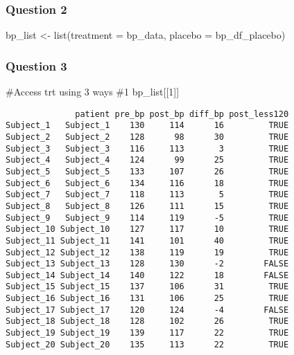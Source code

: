 \documentclass[
  letterpaper,
  DIV=11,
  numbers=noendperiod]{scrartcl}
\newenvironment{Shaded}{\begin{snugshade}}{\end{snugshade}}
\newcommand{\AttributeTok}[1]{\textcolor[rgb]{0.40,0.45,0.13}{#1}}
\newcommand{\CommentTok}[1]{\textcolor[rgb]{0.37,0.37,0.37}{#1}}
\newcommand{\DecValTok}[1]{\textcolor[rgb]{0.68,0.00,0.00}{#1}}
\newcommand{\FunctionTok}[1]{\textcolor[rgb]{0.28,0.35,0.67}{#1}}
\newcommand{\NormalTok}[1]{\textcolor[rgb]{0.00,0.23,0.31}{#1}}
\newcommand{\OtherTok}[1]{\textcolor[rgb]{0.00,0.23,0.31}{#1}}
\newcommand{\SpecialCharTok}[1]{\textcolor[rgb]{0.37,0.37,0.37}{#1}}
\begin{document}
\begin{Shaded}
\end{Shaded}

\subsubsection{Question 2}\label{question-2-2}

\begin{Shaded}
\begin{Highlighting}[]
\NormalTok{bp\_list }\OtherTok{\textless{}{-}} \FunctionTok{list}\NormalTok{(}\AttributeTok{treatment =}\NormalTok{ bp\_data, }\AttributeTok{placebo =}\NormalTok{ bp\_df\_placebo)}
\end{Highlighting}
\end{Shaded}

\subsubsection{Question 3}\label{question-3-2}

\begin{Shaded}
\begin{Highlighting}[]
\CommentTok{\#Access trt using 3 ways}
\CommentTok{\#1}
\NormalTok{bp\_list[[}\DecValTok{1}\NormalTok{]]}
\end{Highlighting}
\end{Shaded}

\begin{verbatim}
              patient pre_bp post_bp diff_bp post_less120
Subject_1   Subject_1    130     114      16         TRUE
Subject_2   Subject_2    128      98      30         TRUE
Subject_3   Subject_3    116     113       3         TRUE
Subject_4   Subject_4    124      99      25         TRUE
Subject_5   Subject_5    133     107      26         TRUE
Subject_6   Subject_6    134     116      18         TRUE
Subject_7   Subject_7    118     113       5         TRUE
Subject_8   Subject_8    126     111      15         TRUE
Subject_9   Subject_9    114     119      -5         TRUE
Subject_10 Subject_10    127     117      10         TRUE
Subject_11 Subject_11    141     101      40         TRUE
Subject_12 Subject_12    138     119      19         TRUE
Subject_13 Subject_13    128     130      -2        FALSE
Subject_14 Subject_14    140     122      18        FALSE
Subject_15 Subject_15    137     106      31         TRUE
Subject_16 Subject_16    131     106      25         TRUE
Subject_17 Subject_17    120     124      -4        FALSE
Subject_18 Subject_18    128     102      26         TRUE
Subject_19 Subject_19    139     117      22         TRUE
Subject_20 Subject_20    135     113      22         TRUE
\end{verbatim}
\end{document}
